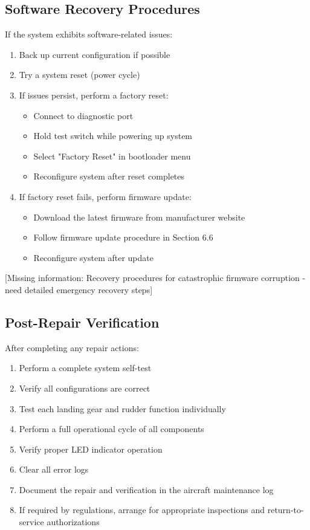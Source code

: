 \documentclass[12pt,a4paper,twoside,openright]{book}
\begin{document}
\subsection{Software Recovery Procedures}

If the system exhibits software-related issues:

\begin{enumerate}
    \item Back up current configuration if possible
    \item Try a system reset (power cycle)
    \item If issues persist, perform a factory reset:
    \begin{itemize}
        \item Connect to diagnostic port
        \item Hold test switch while powering up system
        \item Select "Factory Reset" in bootloader menu
        \item Reconfigure system after reset completes
    \end{itemize}
    \item If factory reset fails, perform firmware update:
    \begin{itemize}
        \item Download the latest firmware from manufacturer website
        \item Follow firmware update procedure in Section 6.6
        \item Reconfigure system after update
    \end{itemize}
\end{enumerate}

{\color{missingred}[Missing information: Recovery procedures for catastrophic firmware corruption - need detailed emergency recovery steps]}

\subsection{Post-Repair Verification}

After completing any repair actions:

\begin{enumerate}
    \item Perform a complete system self-test
    \item Verify all configurations are correct
    \item Test each landing gear and rudder function individually
    \item Perform a full operational cycle of all components
    \item Verify proper LED indicator operation
    \item Clear all error logs
    \item Document the repair and verification in the aircraft maintenance log
    \item If required by regulations, arrange for appropriate inspections and return-to-service authorizations
\end{enumerate}
\end{document}
